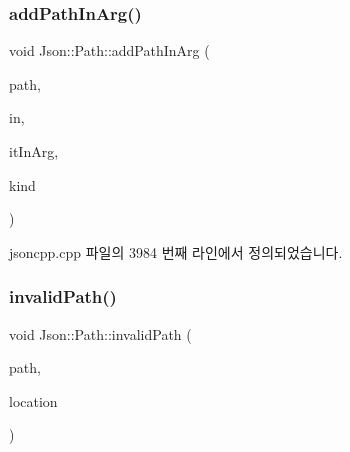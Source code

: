 \subsubsection{\texorpdfstring{add\+Path\+In\+Arg()}{addPathInArg()}}
{\footnotesize\ttfamily void Json\+::\+Path\+::add\+Path\+In\+Arg (\begin{DoxyParamCaption}\item[{const \hyperlink{json_8h_a1e723f95759de062585bc4a8fd3fa4be}{J\+S\+O\+N\+C\+P\+P\+\_\+\+S\+T\+R\+I\+NG} \&}]{path,  }\item[{const \hyperlink{class_json_1_1_path_ab29d7b2fc896c7d3c5ed4609af3a3f23}{In\+Args} \&}]{in,  }\item[{In\+Args\+::const\+\_\+iterator \&}]{it\+In\+Arg,  }\item[{\hyperlink{class_json_1_1_path_argument_a2420bbad778573c147e578701b84d9b9}{Path\+Argument\+::\+Kind}}]{kind }\end{DoxyParamCaption})\hspace{0.3cm}{\ttfamily [private]}}



jsoncpp.\+cpp 파일의 3984 번째 라인에서 정의되었습니다.


\mbox{\label{class_json_1_1_path_a0fa77fc0cefefcfcf2f1242c79009dd9}} 
\subsubsection{\texorpdfstring{invalid\+Path()}{invalidPath()}}
{\footnotesize\ttfamily void Json\+::\+Path\+::invalid\+Path (\begin{DoxyParamCaption}\item[{const \hyperlink{json_8h_a1e723f95759de062585bc4a8fd3fa4be}{J\+S\+O\+N\+C\+P\+P\+\_\+\+S\+T\+R\+I\+NG} \&}]{path,  }\item[{int}]{location }\end{DoxyParamCaption})\hspace{0.3cm}{\ttfamily [private]}}



